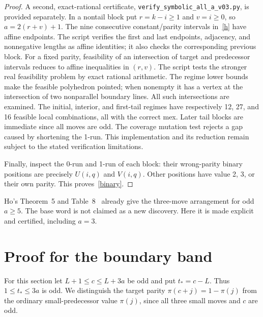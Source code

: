 \documentclass[10pt,a4paper]{article}
\newcommand{\p}{\pi}
\begin{document}
\begin{proof}
A second, exact-rational certificate, \texttt{verify\_symbolic\_all\_a\_v03.py}, is provided separately. In a nontail block put $r=k-i\ge1$ and $v=i\ge0$, so $a=2(r+v)+1$. The nine consecutive constant/parity intervals in~\eqref{h} have affine endpoints. The script verifies the first and last endpoints, adjacency, and nonnegative lengths as affine identities; it also checks the corresponding previous block. For a fixed parity, feasibility of an intersection of target and predecessor intervals reduces to affine inequalities in $(r,v)$. The script tests the stronger real feasibility problem by exact rational arithmetic. The regime lower bounds make the feasible polyhedron pointed; when nonempty it has a vertex at the intersection of two nonparallel boundary lines. All such intersections are examined. The initial, interior, and first-tail regimes have respectively 12, 27, and 16 feasible local combinations, all with the correct mex. Later tail blocks are immediate since all moves are odd. The coverage mutation test rejects a gap caused by shortening the 1-run. This implementation and its reduction remain subject to the stated verification limitations.

Finally, inspect the 0-run and 1-run of each block: their wrong-parity binary positions are precisely $U(i,q)$ and $V(i,q)$. Other positions have value 2, 3, or their own parity. This proves~\eqref{binary}.
\end{proof}
Ho's Theorem~5 and Table~8~\cite{Ho} already give the three-move arrangement for odd $a\ge5$. The base word is not claimed as a new discovery. Here it is made explicit and certified, including $a=3$.

\section{Proof for the boundary band}
For this section let $L+1\le c\le L+3a$ be odd and put $t_*=c-L$. Thus $1\le t_*\le3a$ is odd. We distinguish the target parity $\p(c+j)=1-\p(j)$ from the ordinary small-predecessor value $\p(j)$, since all three small moves and $c$ are odd.
\end{document}
